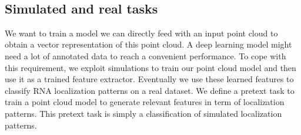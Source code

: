 
~\cite{Xiang_2021_ICCV} %
~\cite{Qi_2017} %
~\cite{Li_2018} %
~\cite{Wu_2019_CVPR} %
~\cite{Thomas_2019_ICCV} %
~\cite{Maturana_2015} %
~\cite{Zaheer_2017} %

\subsection{Simulated and real tasks} \label{subsec:simulation_real_datasets}

We want to train a model we can directly feed with an input point cloud to obtain a vector representation of this point cloud.
A deep learning model might need a lot of annotated data to reach a convenient performance.
To cope with this requirement, we exploit simulations to train our point cloud model and then use it as a trained feature extractor.
Eventually we use these learned features to classify \ac{RNA} localization patterns on a real dataset.
We define a pretext task to train a point cloud model to generate relevant features in term of localization patterns.
This pretext task is simply a classification of simulated localization patterns.

